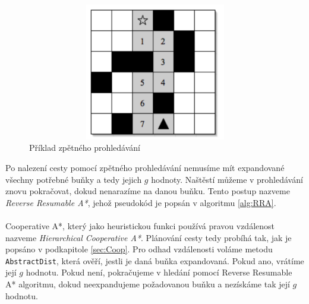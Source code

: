 \begin{figure}[htb]
	\begin{center}
		\includegraphics*[width=15cm,height=6cm,keepaspectratio]{obr/backwardsSearch}
	\end{center}
	\caption[caption]{Příklad zpětného prohledávání \cite{Silver2006}}
	\label{obr:backwardsSearch}
\end{figure}

Po nalezení cesty pomocí zpětného prohledávání nemusíme mít expandované všechny potřebné buňky a tedy jejich $g$ hodnoty. Naštěstí můžeme v prohledávání znovu pokračovat, dokud nenarazíme na danou buňku. Tento postup nazveme \emph{Reverse Resumable A*}, jehož pseudokód je popsán v algoritmu \ref{alg:RRA}.
\\
\\ %
Cooperative A*, který jako heuristickou funkci používá pravou vzdálenost nazveme \emph{Hierarchical Cooperative A*}. Plánování cesty tedy probíhá tak, jak je popsáno v podkapitole \ref{sec:Coop}. Pro odhad vzdálenosti voláme metodu \texttt{AbstractDist}, která ověří, jestli je daná buňka expandovaná. Pokud ano, vrátíme její $g$ hodnotu. Pokud není, pokračujeme v hledání pomocí Reverse Resumable A* algoritmu, dokud neexpandujeme požadovanou buňku a nezískáme tak její $g$ hodnotu.

